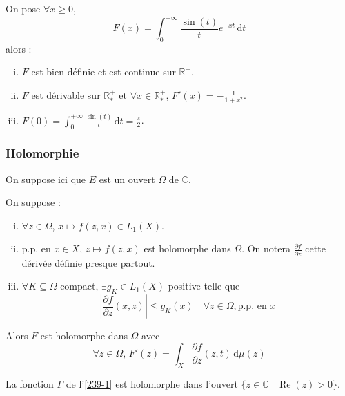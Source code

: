
	\begin{application}
		On pose $\forall x \geq 0$,
		\[ F(x) = \int_0^{+\infty} \frac{\sin(t)}{t} e^{-xt} \, \mathrm{d}t \]
		alors :
		\begin{enumerate}[(i)]
			\item $F$ est bien définie et est continue sur $\mathbb{R}^+$.
			\item $F$ est dérivable sur $\mathbb{R}^+_*$ et $\forall x \in \mathbb{R}^+_*$, $F'(x) = -\frac{1}{1+x^2}$.
			\item $F(0) = \int_0^{+\infty} \frac{\sin(t)}{t} \, \mathrm{d}t = \frac{\pi}{2}$.
		\end{enumerate}
	\end{application}

	\subsubsection{Holomorphie}


	On suppose ici que $E$ est un ouvert $\Omega$ de $\mathbb{C}$.

	\begin{theorem}
		On suppose :
		\begin{enumerate}[(i)]
			\item $\forall z \in \Omega$, $x \mapsto f(z,x) \in L_1(X)$.
			\item p.p. en $x \in X$, $z \mapsto f(z,x)$ est holomorphe dans $\Omega$. On notera $\frac{\partial f}{\partial z}$ cette dérivée définie presque partout.
			\item $\forall K \subseteq \Omega$ compact, $\exists g_K \in L_1(X)$ positive telle que
			\[ \left| \frac{\partial f}{\partial z}(x,z) \right| \leq g_K(x) \quad \forall z \in \Omega, \text{p.p. en } x \]
		\end{enumerate}
		Alors $F$ est holomorphe dans $\Omega$ avec
		\[ \forall z \in \Omega, \, F'(z) = \int_X \frac{\partial f}{\partial z}(z, t) \, \mathrm{d}\mu(z) \]
	\end{theorem}

	\begin{example}
		La fonction $\Gamma$ de l'\cref{239-1} est holomorphe dans l'ouvert $\{ z \in \mathbb{C} \mid \operatorname{Re}(z) > 0 \}$.
	\end{example}

